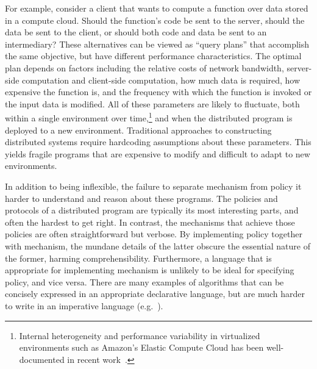 \documentclass[twocolumn]{article}
\begin{document}
For example, consider a client that wants to compute a function over
data stored in a compute cloud. Should the function's code be sent to
the server, should the data be sent to the client, or should both code
and data be sent to an intermediary? These alternatives can be viewed
as ``query plans'' that accomplish the same objective, but have
different performance characteristics. The optimal plan depends on
factors including the relative costs of network bandwidth, server-side
computation and client-side computation, how much data is required,
how expensive the function is, and the frequency with which the
function is invoked or the input data is modified. All of these
parameters are likely to fluctuate, both within a single environment
over time,\footnote{Internal heterogeneity and performance variability
  in virtualized environments such as Amazon's Elastic Compute Cloud
  has been well-documented in recent work~\cite{late-sched}.} and when
the distributed program is deployed to a new environment. Traditional
approaches to constructing distributed systems require hardcoding
assumptions about these parameters. This yields fragile programs that
are expensive to modify and difficult to adapt to new environments.

In addition to being inflexible, the failure to separate mechanism from
policy it harder to understand and reason about these programs. The
policies and protocols of a distributed program are typically its most
interesting parts, and often the hardest to get right. In contrast,
the mechanisms that achieve those policies are often straightforward
but verbose. By implementing policy together with mechanism, the
mundane details of the latter obscure the essential nature of the
former, harming comprehensibility. Furthermore, a language that is
appropriate for implementing mechanism is unlikely to be ideal for
specifying policy, and vice versa. There are many examples of
algorithms that can be concisely expressed in an appropriate
declarative language, but are much harder to write in an imperative
language (e.g.\ \cite{chord-overlog}).
\end{document}
